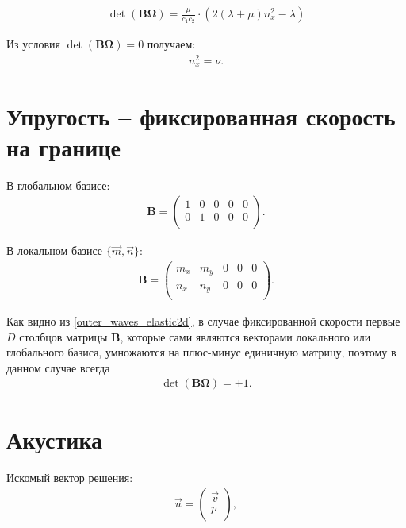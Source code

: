 \begin{eqnarray}
	\det (\mathbf{B} \mathbf{\Omega}) = \frac{\mu}{c_1 c_2} \cdot (2 (\lambda + \mu) n^2_x - \lambda)
\end{eqnarray}

Из условия $\det (\mathbf{B} \mathbf{\Omega}) = 0$ получаем:
\begin{eqnarray}
	 n^2_x = \nu.
\end{eqnarray}


\section{Упругость -- фиксированная скорость на границе}

В глобальном базисе:
\begin{align}
	\mathbf{B} =
	\left( \begin{array}{cccccccccccc}
	 1 & 0 & 0 & 0 & 0 \\
	 0 & 1 & 0 & 0 & 0 \\
	\end{array} \right).
\end{align}

В локальном базисе $\{\vec{m}, \vec{n}\}$:
\begin{align}
	\mathbf{B} =
	\left( \begin{array}{cccccccccccc}
	 m_x & m_y & 0 & 0 & 0 \\
	 n_x & n_y & 0 & 0 & 0 \\
	\end{array} \right).
\end{align}

Как видно из \eqref{outer_waves_elastic2d}, в случае фиксированной скорости первые $D$ столбцов матрицы $\mathbf{B}$, которые сами являются векторами локального или глобального базиса, умножаются на плюс-минус единичную матрицу, поэтому в данном случае всегда
\begin{eqnarray}
	 \det (\mathbf{B} \mathbf{\Omega}) = \pm 1.
\end{eqnarray}


\section{Акустика}
Искомый вектор решения:
\begin{align}
	\vec{u} =
	\left( \begin{array}{cccccccccccc}
	 \vec{v} \\
	 p \\
	\end{array} \right),
\end{align} 

